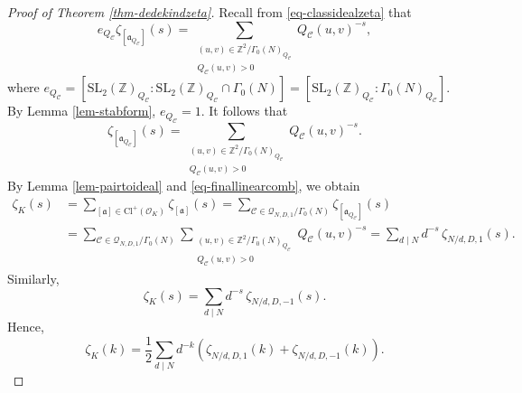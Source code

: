 \documentclass[12pt]{amsart}
\numberwithin{equation}{section}
\theoremstyle{definition}
\begin{document}
\begin{proof}[Proof of Theorem \ref{thm-dedekindzeta}]
Recall from \eqref{eq-classidealzeta} that
$$e_{Q_{\mathcal{C}}}\zeta_{[\mathfrak{a}_{Q_{\mathcal{C}}}]}(s)=\sum\limits_{\substack{(u,v)\in\mathbb{Z}^{2}/\Gamma_{0}(N)_{Q_{\mathcal{C}}} \\ Q_{\mathcal{C}}(u,v)>0}}Q_{\mathcal{C}}(u,v)^{-s},$$
where $e_{Q_{\mathcal{C}}}=[\mathrm{SL}_{2}(\mathbb{Z})_{Q_{\mathcal{C}}}:\mathrm{SL}_{2}(\mathbb{Z})_{Q_{\mathcal{C}}}\cap\Gamma_{0}(N)]=[\mathrm{SL}_{2}(\mathbb{Z})_{Q_{\mathcal{C}}}:\Gamma_{0}(N)_{Q_{\mathcal{C}}}]$. By Lemma \ref{lem-stabform}, $e_{Q_{\mathcal{C}}}=1$. It follows that
$$\zeta_{[\mathfrak{a}_{Q_{\mathcal{C}}}]}(s)=\sum\limits_{\substack{(u,v)\in\mathbb{Z}^{2}/\Gamma_{0}(N)_{Q_{\mathcal{C}}} \\ Q_{\mathcal{C}}(u,v)>0}}Q_{\mathcal{C}}(u,v)^{-s}.$$
By Lemma \ref{lem-pairtoideal} and \eqref{eq-finallinearcomb}, we obtain
\begin{align*}
    \zeta_{K}(s)
    &=\sum_{[\mathfrak{a}]\in\mathrm{Cl}^{+}(\mathcal{O}_{K})}\zeta_{[\mathfrak{a}]}(s)
    =\sum_{\mathcal{C}\in\mathcal{Q}_{N,D,1}/\Gamma_{0}(N)}\zeta_{[\mathfrak{a}_{Q_{\mathcal{C}}}]}(s)\\
    &=\sum_{\mathcal{C}\in\mathcal{Q}_{N,D,1}/\Gamma_{0}(N)}\sum_{\substack{(u,v)\in\mathbb{Z}^{2}/\Gamma_{0}(N)_{Q_{\mathcal{C}}} \\ Q_{\mathcal{C}}(u,v)>0}}Q_{\mathcal{C}}(u,v)^{-s}
    =\sum_{d\mid N} d^{-s}\,\zeta_{N/d,D,1}(s).
\end{align*}
Similarly,
\[
    \zeta_{K}(s)=\sum_{d\mid N} d^{-s}\,\zeta_{N/d,D,-1}(s).
\]
Hence,
\begin{equation}\label{eq-dedekindformzetasum}
    \zeta_{K}(k)=\frac{1}{2}\sum_{d\mid N}d^{-k}(\zeta_{N/d,D,1}(k)+\zeta_{N/d,D,-1}(k)).
\end{equation}


\end{proof}
\end{document}
